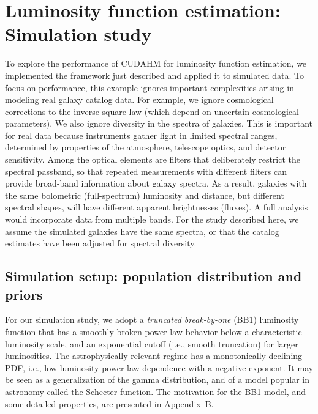 \section{Luminosity function estimation: Simulation study}
\label{sec:lum_func_sim}

To explore the performance of CUDAHM for luminosity function estimation, we implemented the framework just described and applied it to simulated data.
To focus on performance, this example ignores important complexities arising in modeling real galaxy catalog data.
For example, we ignore cosmological corrections to the inverse square law (which depend on uncertain cosmological parameters).
We also ignore diversity in the spectra of galaxies.
This is important for real data because instruments gather light in limited spectral ranges, determined by properties of the atmosphere, telescope optics, and detector sensitivity.
Among the optical elements are filters that deliberately restrict the spectral passband, so that repeated measurements with different filters can provide broad-band information about galaxy spectra.
As a result, galaxies with the same bolometric (full-spectrum) luminosity and distance, but different spectral shapes, will have different apparent brightnesses (fluxes).
A full analysis would incorporate data from multiple bands.
For the study described here, we assume the simulated galaxies have the same spectra, or that the catalog estimates have been adjusted for spectral diversity.

\subsection{Simulation setup: population distribution and priors}
\label{sec:simsetup-popn}

For our simulation study, we adopt a \emph{truncated break-by-one} (BB1) luminosity function that has a smoothly broken power law behavior below a characteristic luminosity scale, and an exponential cutoff (i.e., smooth truncation) for larger luminosities.
The astrophysically relevant regime has a monotonically declining PDF, i.e., low-luminosity power law dependence with a negative exponent.
It may be seen as a generalization of the gamma distribution, and of a  model popular in astronomy called the Schecter function.
The motivation for the BB1 model, and some detailed properties, are presented in Appendix~B.
  
